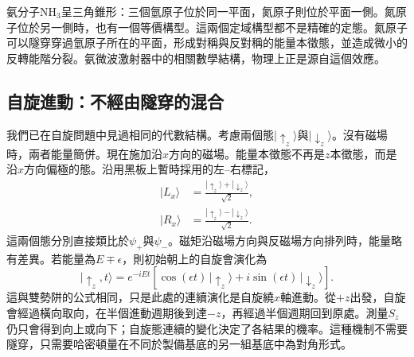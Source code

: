氨分子\(\mathrm{NH}_3\)呈三角錐形：三個氫原子位於同一平面，氮原子則位於平面一側。氮原子位於另一側時，也有一個等價構型。這兩個定域構型都不是精確的定態。氮原子可以隧穿穿過氫原子所在的平面，形成對稱與反對稱的能量本徵態，並造成微小的反轉能階分裂。氨微波激射器中的相關數學結構，物理上正是源自這個效應。

\begin{classroomqa}
\end{classroomqa}

\begin{classroomqa}
\end{classroomqa}

\subsection{自旋進動：不經由隧穿的混合}

我們已在自旋問題中見過相同的代數結構。考慮兩個態\(|\uparrow_z\rangle\)與\(|\downarrow_z\rangle\)。沒有磁場時，兩者能量簡併。現在施加沿\(x\)方向的磁場。能量本徵態不再是\(z\)本徵態，而是沿\(x\)方向偏極的態。沿用黑板上暫時採用的左--右標記，
\begin{align}
|L_x\rangle &= \frac{|\uparrow_z\rangle+|\downarrow_z\rangle}{\sqrt{2}},\\
|R_x\rangle &= \frac{|\uparrow_z\rangle-|\downarrow_z\rangle}{\sqrt{2}}.
\end{align}
這兩個態分別直接類比於\(\psi_+\)與\(\psi_-\)。磁矩沿磁場方向與反磁場方向排列時，能量略有差異。若能量為\(E\mp\epsilon\)，則初始朝上的自旋會演化為
\begin{equation}
|\uparrow_z,t\rangle
= e^{-iEt}\left[\cos(\epsilon t)\,|\uparrow_z\rangle
+ i\sin(\epsilon t)\,|\downarrow_z\rangle\right].
\end{equation}
這與雙勢阱的公式相同，只是此處的連續演化是自旋繞\(x\)軸進動。從\(+z\)出發，自旋會經過橫向取向，在半個進動週期後到達\(-z\)，再經過半個週期回到原處。測量\(S_z\)仍只會得到向上或向下；自旋態連續的變化決定了各結果的機率。這種機制不需要隧穿，只需要哈密頓量在不同於製備基底的另一組基底中為對角形式。

